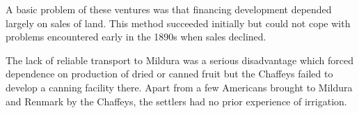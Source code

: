 A basic problem of these ventures was that financing development
depended largely on sales of land.  This method succeeded initially
but could not cope with problems encountered early in the 1890s when
sales declined.

The lack of reliable transport to Mildura was a serious disadvantage
which forced dependence on production of dried or canned fruit but the
Chaffeys failed to develop a canning facility there.  Apart from a few
Americans brought to Mildura and Renmark by the Chaffeys, the settlers
had no prior experience of irrigation.

